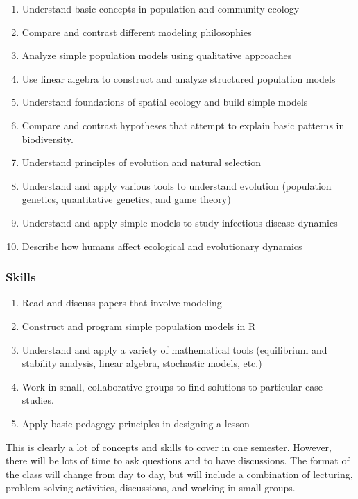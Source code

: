 \documentclass[12pt,]{article}
\providecommand{\tightlist}{%
  \setlength{\itemsep}{0pt}\setlength{\parskip}{0pt}}
\begin{document}
\begin{enumerate}
\def\labelenumi{\arabic{enumi}.}
\tightlist
\item
  Understand basic concepts in population and community ecology
\item
  Compare and contrast different modeling philosophies
\item
  Analyze simple population models using qualitative approaches
\item
  Use linear algebra to construct and analyze structured population
  models
\item
  Understand foundations of spatial ecology and build simple models
\item
  Compare and contrast hypotheses that attempt to explain basic patterns
  in biodiversity.
\item
  Understand principles of evolution and natural selection
\item
  Understand and apply various tools to understand evolution (population
  genetics, quantitative genetics, and game theory)
\item
  Understand and apply simple models to study infectious disease
  dynamics
\item
  Describe how humans affect ecological and evolutionary dynamics
\end{enumerate}

\subsubsection{Skills}\label{skills}

\begin{enumerate}
\def\labelenumi{\arabic{enumi}.}
\setcounter{enumi}{10}
\tightlist
\item
  Read and discuss papers that involve modeling
\item
  Construct and program simple population models in R
\item
  Understand and apply a variety of mathematical tools (equilibrium and
  stability analysis, linear algebra, stochastic models, etc.)
\item
  Work in small, collaborative groups to find solutions to particular
  case studies.
\item
  Apply basic pedagogy principles in designing a lesson
\end{enumerate}

This is clearly a lot of concepts and skills to cover in one semester.
However, there will be lots of time to ask questions and to have
discussions. The format of the class will change from day to day, but
will include a combination of lecturing, problem-solving activities,
discussions, and working in small groups.
\end{document}
